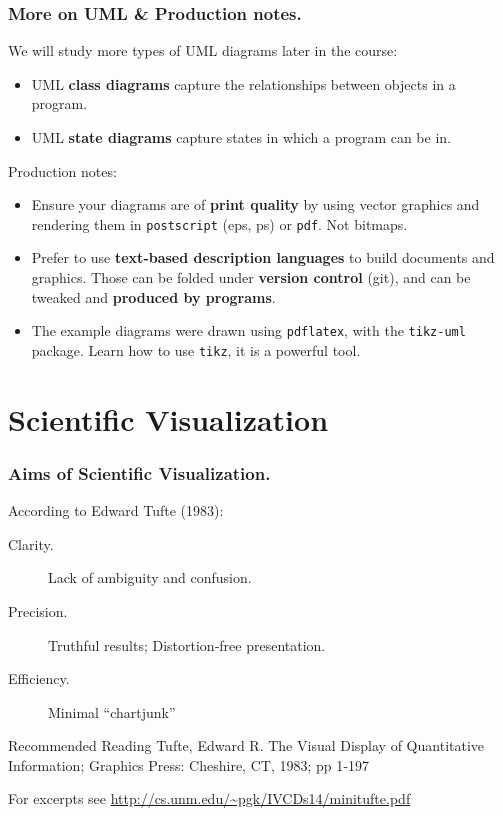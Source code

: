 \documentclass{beamer} %
\newcommand\emc[1]{\textcolor{brightblue}{\textbf{#1}}}
\begin{document}
\begin{frame}

\frametitle{More on UML \& Production notes.}

We will study more types of UML diagrams later in the course:
\begin{itemize}
  \item UML \emc{class diagrams} capture the relationships between objects in a program.
  \item UML \emc{state diagrams} capture states in which a program can be in.
\end{itemize}

\vspace{3mm}
Production notes:
\begin{itemize}
  \item Ensure your diagrams are of \emc{print quality} by using vector graphics and rendering them in \texttt{postscript} (eps, ps) or \texttt{pdf}. Not bitmaps.
  \item Prefer to use \emc{text-based description languages} to build documents and graphics. Those can be folded under \emc{version control} (git), and can be tweaked and \emc{produced by programs}. 
  \item The example diagrams were drawn using \texttt{pdflatex}, with the \texttt{tikz-uml} package. Learn how to use \texttt{tikz}, it is a powerful tool.
\end{itemize}

\end{frame}


\section{Scientific Visualization}

\begin{frame}

\frametitle{Aims of Scientific Visualization.}

According to Edward Tufte (1983):
\begin{description}
\item[Clarity.] Lack of ambiguity and confusion.
\item[Precision.] Truthful results; Distortion‐free presentation.
\item[Efficiency.] Minimal ``chartjunk''
\end{description}

\vspace{5mm}
\begin{block}{Recommended Reading}
Tufte, Edward R. The Visual Display of Quantitative
Information; Graphics Press: Cheshire, CT, 1983; pp 1‐197
\end{block}

For excerpts see \url{http://cs.unm.edu/~pgk/IVCDs14/minitufte.pdf}

\end{frame}
\end{document}
